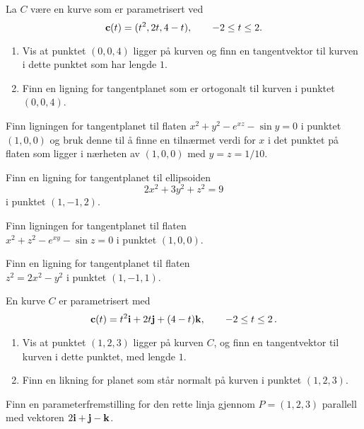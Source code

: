 

\oppgave[K2016, Oppgave 2] La $C$ være en kurve som er parametrisert ved
%
\begin{equation*}
  \mathbf{c}(t) = (t^2, 2t, 4 - t), \qquad -2 \leq t \leq 2.
\end{equation*}
%
\begin{enumerate}
  \item Vis at punktet $(0,0,4)$ ligger på kurven og finn en tangentvektor til
    kurven i dette punktet som har lengde $1$.
  \item Finn en ligning for tangentplanet som er ortogonalt til kurven i punktet $(0,0,4)$.
\end{enumerate}

\oppgave[K2015, Oppgave 3] Finn ligningen for tangentplanet til flaten $x^2 +
y^2 - e^{xz} - \sin y = 0$ i punktet $(1,0,0)$ og bruk denne til å finne en
tilnærmet verdi for $x$ i det punktet på flaten som ligger i nærheten av
$(1,0,0)$ med $y = z = 1/10$.

\oppgave[V2015, Oppgave 1] Finn en ligning for tangentplanet til ellipsoiden
%
\begin{equation*}
  2x^2 + 3y^2 + z^2 = 9
\end{equation*}
%
i punktet $(1, -1, 2)$.

\oppgave[K2014, Oppgave 1] Finn ligningen for tangentplanet til flaten \\ $x^2 +
z^2 - e^{xy} - \sin z = 0$ i punktet $(1, 0, 0)$.

\oppgave[K2013, Oppgave 1] Finn en ligning for tangentplanet til flaten \\ $z^2 =
2x^2 - y^2$ i punktet $(1, -1, 1)$.

\oppgave[V2013, Oppgave 3] En kurve $C$ er parametrisert med
%
\begin{equation*}
  \mathbf{c}(t) = t^2\mathbf{i} + 2t \mathbf{j} + (4 - t) \mathbf{k}, \qquad -2 \leq t \leq 2\,.
\end{equation*}
%
\begin{enumerate}
  \item Vis at punktet $(1,2,3)$ ligger på kurven $C$, og finn en tangentvektor
    til kurven i dette punktet, med lengde $1$.
  \item Finn en likning for planet som står normalt på kurven i punktet $(1,2,3)$.
\end{enumerate}

\oppgave[V2012, Oppgave 1] Finn en parameterfremstilling for den rette linja
gjennom $P = (1,2,3)$ parallell med vektoren $2\mathbf{i} + \mathbf{j} - \mathbf{k}$.